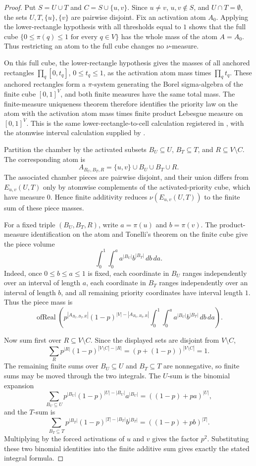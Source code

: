 \begin{proof}
Put \(S=U\cup T\) and \(C=S\cup\{u,v\}\).  Since \(u\ne v\),
\(u,v\notin S\), and \(U\cap T=\emptyset\), the sets
\(U,T,\{u\},\{v\}\) are pairwise disjoint.  Fix an activation atom
\(A_0\).  Applying the lower-rectangle hypothesis with all thresholds equal
to \(1\) shows that the full cube
\(\{0\le \pi(q)\le1\text{ for every }q\in V\}\) has the whole mass of the
atom \(A=A_0\).  Thus restricting an atom to the full cube changes no
\(\nu\)-measure.

On this full cube, the lower-rectangle hypothesis gives the masses of all
anchored rectangles \(\prod_q[0,t_q]\), \(0\le t_q\le1\), as the activation
atom mass times \(\prod_q t_q\).  These anchored rectangles form a
\(\pi\)-system generating the Borel sigma-algebra of the finite cube
\([0,1]^V\), and both finite measures have the same total mass.  The
finite-measure uniqueness theorem therefore identifies the priority law on
the atom with the activation atom mass times finite product Lebesgue measure
on \([0,1]^V\).  This is the same lower-rectangle-to-cell calculation
registered in , with the
atomwise interval calculation supplied by
.

Partition the chamber by the activated subsets \(B_U\subseteq U\),
\(B_T\subseteq T\), and \(R\subseteq V\setminus C\).  The corresponding atom
is
\[
A_{B_U,B_T,R}=\{u,v\}\cup B_U\cup B_T\cup R .
\]
The associated chamber pieces are pairwise disjoint, and their union differs
from \(E_{u,v}(U,T)\) only by atomwise complements of the activated-priority
cube, which have measure \(0\).  Hence finite additivity reduces
\(\nu(E_{u,v}(U,T))\) to the finite sum of these piece masses.

For a fixed triple \((B_U,B_T,R)\), write \(a=\pi(u)\) and \(b=\pi(v)\).
The product-measure identification on the atom and Tonelli's theorem on the
finite cube give the piece volume
\[
\int_0^1\int_0^a a^{|B_U|}b^{|B_T|}\,db\,da .
\]
Indeed, once \(0\le b\le a\le1\) is fixed, each coordinate in \(B_U\) ranges
independently over an interval of length \(a\), each coordinate in \(B_T\)
ranges independently over an interval of length \(b\), and all remaining
priority coordinates have interval length \(1\).  Thus the piece mass is
\[
\operatorname{ofReal}\!\left(
p^{|A_{B_U,B_T,R}|}(1-p)^{|V|-|A_{B_U,B_T,R}|}
\int_0^1\int_0^a a^{|B_U|}b^{|B_T|}\,db\,da\right).
\]

Now sum first over \(R\subseteq V\setminus C\).  Since the displayed sets are
disjoint from \(V\setminus C\),
\[
\sum_R p^{|R|}(1-p)^{|V\setminus C|-|R|}
=(p+(1-p))^{|V\setminus C|}=1 .
\]
The remaining finite sums over \(B_U\subseteq U\) and \(B_T\subseteq T\) are
nonnegative, so finite sums may be moved through the two integrals.  The
\(U\)-sum is the binomial expansion
\[
\sum_{B_U\subseteq U}p^{|B_U|}(1-p)^{|U|-|B_U|}a^{|B_U|}
=((1-p)+pa)^{|U|},
\]
and the \(T\)-sum is
\[
\sum_{B_T\subseteq T}p^{|B_T|}(1-p)^{|T|-|B_T|}b^{|B_T|}
=((1-p)+pb)^{|T|}.
\]
Multiplying by the forced activations of \(u\) and \(v\) gives the factor
\(p^2\).  Substituting these two binomial identities into the finite additive
sum gives exactly the stated integral formula.
\end{proof}
